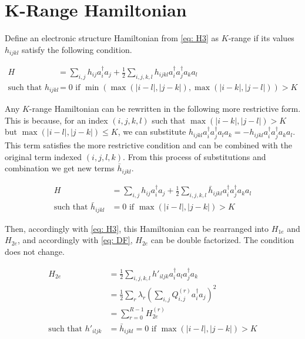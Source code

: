 

\section{K-Range Hamiltonian}

Define an electronic structure Hamiltonian from \eqref{eq: H3} as $K$-range if its values $h_{ijkl}$ satisfy the following condition.

\begin{equation}
    \begin{split}
        H &= \sum_{i, j} h_{ij}a^\dag_ia_j + \frac{1}{2}\sum_{i,j,k,l} h_{ijkl}a^\dag_ia^\dag_ja_ka_l  \\
        \text{such that } h_{ijkl} &= 0 \text{ if } \min(\max(|i - l|, |j - k|), \max(|i - k|, |j - l|)) > K
    \end{split}
\end{equation}

Any $K$-range Hamiltonian can be rewritten in the following more restrictive form. This is because, for an index $(i, j, k, l)$ such that $\max(|i - k|, |j - l|) > K$ but $\max(|i - l|, |j - k|) \leq K$, we can substitute $h_{ijkl}a^\dag_ia^\dag_ja_la_k = -h_{ijkl}a^\dag_ia^\dag_ja_ka_l$. This term satisfies the more restrictive condition and can be combined with the original term indexed $(i, j, l, k)$. From this process of substitutions and combination we get new terms $\bar{h}_{ijkl}$.

\begin{equation}
    \begin{split}
        H &= \sum_{i, j} h_{ij}a^\dag_ia_j + \frac{1}{2}\sum_{i,j,k,l} \bar{h}_{ijkl}a^\dag_ia^\dag_ja_ka_l \\
        \text{such that } \bar{h}_{ijkl} &= 0 \text{ if } \max(|i - l|, |j - k|) > K
    \end{split}
\end{equation}

Then, accordingly with \eqref{eq: H3}, this Hamiltonian can be rearranged into $H_{1e}$ and $H_{2e}$, and accordingly with \eqref{eq: DF}, $H_{2e}$ can be double factorized. The condition does not change.

\begin{equation}
    \begin{split}
        H_{2e} &= \frac{1}{2}\sum_{i,j,k,l} h'_{iljk}a^\dag_ia_la^\dag_ja_k \\
        &= \frac{1}{2}\sum_r\lambda_r\left(\sum_{i,j} Q^{(r)}_{i, j}a^\dag_ia_j\right)^2 \\
        &= \sum_{r = 0}^{R - 1} H_{2e}^{(r)} \\
        \text{such that } h'_{iljk} &= \bar{h}_{ijkl} = 0 \text{ if } \max(|i - l|, |j - k|) > K
    \end{split}
\end{equation}

